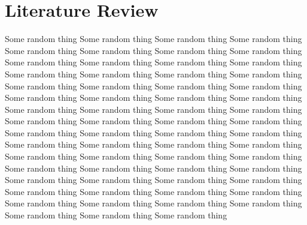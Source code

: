 \chapter{Literature Review}
\label{chap:chapter2}
Some random thing Some random thing Some random thing Some random thing Some random thing Some random thing Some random thing Some random thing Some random thing Some random thing Some random thing Some random thing Some random thing Some random thing Some random thing Some random thing Some random thing Some random thing Some random thing Some random thing Some random thing Some random thing Some random thing Some random thing Some random thing Some random thing Some random thing Some random thing Some random thing Some random thing Some random thing Some random thing Some random thing Some random thing Some random thing Some random thing Some random thing Some random thing Some random thing Some random thing Some random thing Some random thing Some random thing Some random thing Some random thing Some random thing Some random thing Some random thing Some random thing Some random thing Some random thing Some random thing Some random thing Some random thing Some random thing Some random thing Some random thing Some random thing Some random thing Some random thing Some random thing Some random thing Some random thing \\ 


